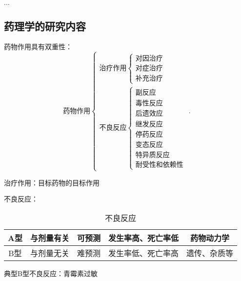 $\ldots$ 
\subsection{药理学的研究内容}%
\label{sub:药理学的研究内容}
\begin{notation}
    药物作用具有双重性：
    \[
        \text{药物作用}
        \begin{cases}
            \text{治疗作用}\begin{cases}
                \text{对因治疗}\\
                \text{对症治疗}\\
                \text{补充治疗}
            \end{cases}\\
            \text{不良反应}\begin{cases}
                \text{副反应}\\
                \text{毒性反应}\\
                \text{后遗效应}\\
                \text{继发反应}\\
                \text{停药反应}\\
                \text{变态反应}\\
                \text{特异质反应}\\
                \text{耐受性和依赖性}
            \end{cases}
        \end{cases}
    .\] 
\end{notation}
\begin{notation}
    治疗作用：目标药物的目标作用
\end{notation}
\begin{notation}
    不良反应：
    \begin{table}[htpb]
        \centering
        \caption{不良反应}
        \label{tab:不良反应}
        \begin{tabular}{|c|c|c|c|c|}
        \hline
        A型 & 与剂量有关 & 可预测 & 发生率高、死亡率低 & 药物动力学 \\
        \hline
        B型 & 与剂量无关 & 难预测 & 发生率低、死亡率高 & 遗传、杂质等\\
        \hline
        \end{tabular}
    \end{table}
\end{notation}
\begin{eg}
    典型B型不良反应：青霉素过敏
\end{eg}
